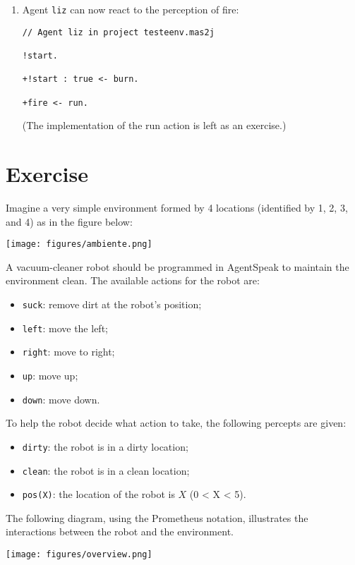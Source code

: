 \documentclass[a4paper]{article}
\begin{document}
\begin{enumerate}
\item Agent \texttt{liz} can now react to the perception of fire:
\begin{verbatim}
// Agent liz in project testeenv.mas2j

!start.

+!start : true <- burn.

+fire <- run.
\end{verbatim}

  (The implementation of the run action is left as an exercise.)
\end{enumerate}

\section{Exercise}

Imagine a very simple environment formed by 4 locations (identified by 1, 2, 3,
and 4) as in the figure below:

\begin{center}
\texttt{[image: figures/ambiente.png]}  
\end{center}

A vacuum-cleaner robot should be programmed in AgentSpeak to maintain
the environment clean. The available actions for the robot are:
\begin{itemize}
\item \texttt{suck}: remove dirt at the robot's position;
\item \texttt{left}: move the left;
\item \texttt{right}: move to right;
\item \texttt{up}: move up;
\item \texttt{down}: move down.
\end{itemize}
To help the robot decide what action to take, the following percepts
are given:
\begin{itemize}
\item \texttt{dirty}: the robot is in a dirty location; 
\item \texttt{clean}: the robot is in a clean location; 
\item \texttt{pos(X)}: the location of the robot is $X$ (0 < X < 5).
\end{itemize}

The following diagram, using the Prometheus notation, illustrates the
interactions between the robot and the environment.
\begin{center}
  \texttt{[image: figures/overview.png]}
\end{center}
\end{document}
